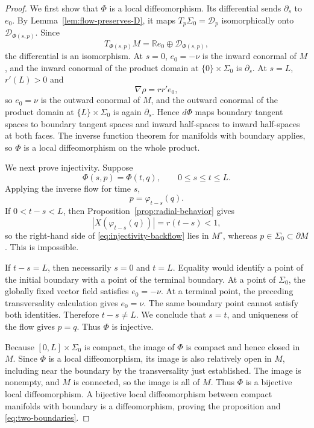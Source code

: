 \documentclass[11pt,a4paper]{article}
\numberwithin{equation}{section}
\newcommand{\R}{\mathbb R}
\newcommand{\Dcal}{\mathcal D}
\begin{document}
\begin{proof}
We first show that $\Phi$ is a local diffeomorphism.  Its differential sends $\partial_s$ to $e_0$.  By Lemma~\ref{lem:flow-preserves-D}, it maps $T_p\Sigma_0=\Dcal_p$ isomorphically onto $\Dcal_{\Phi(s,p)}$.  Since
$$
        T_{\Phi(s,p)}M
        =\R e_0\oplus\Dcal_{\Phi(s,p)},
$$
the differential is an isomorphism.  At $s=0$, $e_0=-\nu$ is the inward conormal of $M$, and the inward
conormal of the product domain at $\{0\}\times\Sigma_0$ is $\partial_s$.
At $s=L$, $r'(L)>0$ and
$$
        \nabla\rho=rr'e_0,
$$
so $e_0=\nu$ is the outward conormal of $M$, and the outward conormal of the
product domain at $\{L\}\times\Sigma_0$ is again $\partial_s$.  Hence
$d\Phi$ maps boundary tangent spaces to boundary tangent spaces and inward
half-spaces to inward half-spaces at both faces.  The inverse function theorem
for manifolds with boundary applies, so $\Phi$ is a local diffeomorphism on
the whole product.

We next prove injectivity.  Suppose
$$
        \Phi(s,p)=\Phi(t,q),
        \qquad
        0\le s\le t\le L.
$$
Applying the inverse flow for time $s$,
\begin{equation}\label{eq:injectivity-backflow}
        p=\varphi_{t-s}(q).
\end{equation}
If $0<t-s<L$, then Proposition~\ref{prop:radial-behavior} gives
$$
        |X(\varphi_{t-s}(q))|=r(t-s)<1,
$$
so the right-hand side of \eqref{eq:injectivity-backflow} lies in $M^\circ$, whereas $p\in\Sigma_0\subset\partial M$.  This is impossible.

If $t-s=L$, then necessarily $s=0$ and $t=L$.  Equality would identify a point of the initial boundary with a point of the terminal boundary.  At a point of $\Sigma_0$, the globally fixed vector field satisfies $e_0=-\nu$.  At a terminal point, the preceding transversality calculation gives $e_0=\nu$.  The same boundary point cannot satisfy both identities.  Therefore $t-s\ne L$.  We conclude that $s=t$, and uniqueness of the flow gives $p=q$.  Thus $\Phi$ is injective.

Because $[0,L]\times\Sigma_0$ is compact, the image of $\Phi$ is compact and hence closed in $M$.  Since $\Phi$ is a local diffeomorphism, its image is also relatively open in $M$, including near the boundary by the transversality just established.  The image is nonempty, and $M$ is connected, so the image is all of $M$.  Thus $\Phi$ is a bijective local diffeomorphism.  A bijective local diffeomorphism between compact manifolds with boundary is a diffeomorphism, proving the proposition and \eqref{eq:two-boundaries}.
\end{proof}
\end{document}

